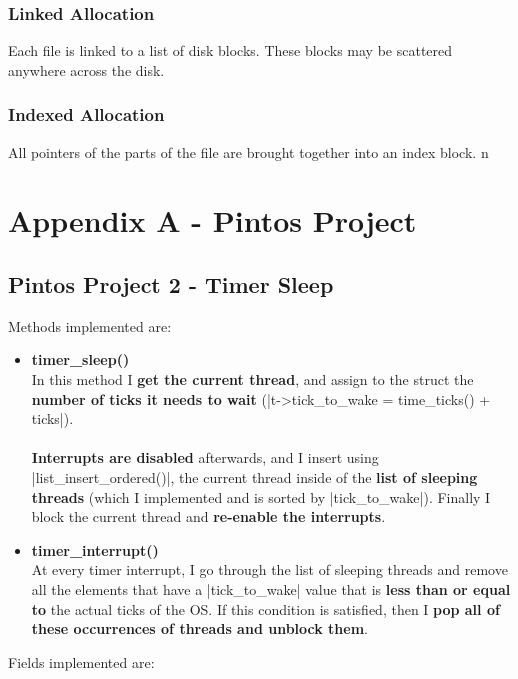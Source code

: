 \documentclass{article}
\begin{document}
\subsubsection{Linked Allocation}
Each file is linked to a list of disk blocks. These blocks may be scattered anywhere across the disk.

\subsubsection{Indexed Allocation}
All pointers of the parts of the file are brought together into an index block. n


\newpage



\section{Appendix A - Pintos Project}
\subsection{Pintos Project 2 - Timer Sleep}
Methods implemented are:

\begin{itemize}
	\item \textbf{timer\_sleep()}
	\vspace{.2cm} \\
	In this method I \textbf{get the current thread}, and assign to the struct the \textbf{number of ticks it needs to wait} (\cverb|t->tick_to_wake = time_ticks() + ticks|). \\ \\
	\textbf{Interrupts are disabled} afterwards, and I insert using \cverb|list_insert_ordered()|, the current thread inside of the \textbf{list of sleeping threads} (which I implemented and is sorted by \cverb|tick_to_wake|). Finally I block the current thread and \textbf{re-enable the interrupts}.
	
	\item \textbf{timer\_interrupt()}
	\vspace{.2cm} \\
	At every timer interrupt, I go through the list of sleeping threads and remove all the elements that have a \cverb|tick_to_wake| value that is \textbf{less than or equal to} the actual ticks of the OS. If this condition is satisfied, then I \textbf{pop all of these occurrences of threads and unblock them}.
\end{itemize}
Fields implemented are:
\end{document}
